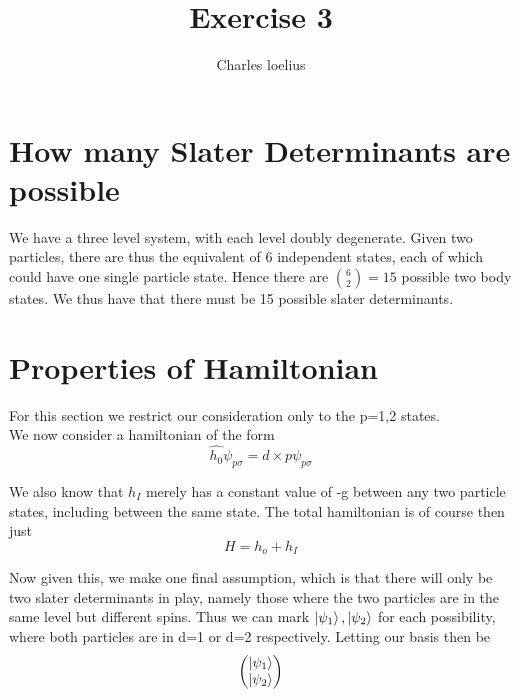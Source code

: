 \documentclass[11pt]{article} %
\title{Exercise 3}
\author{Charles loelius}
\begin{document}
\maketitle

\section{How many Slater Determinants are possible}

We have a three level system, with each level doubly degenerate. Given two particles, there are thus the equivalent of 6 independent states, each of which could have one single particle state. Hence there are ${ 6 \choose 2}=15$ possible two body states. We thus have that there must be 15 possible slater determinants. 

\section{Properties of Hamiltonian}
For this section we restrict our consideration only to the p=1,2 states.\\

We now consider a hamiltonian of the form\\
\begin{equation}
\hat{h_0}\psi_{p \sigma}=d\times p\psi_{p \sigma}
\end{equation}

We also know that $h_I$ merely has a constant value of -g between any two particle states, including between the same state. The total hamiltonian is of course then just \\
\begin{equation}
H=h_o+h_I
\end{equation}

Now given this, we make one final assumption, which is that there will only be two slater determinants in play, namely those where the two particles are in the same level but different spins. Thus we can mark $\ket{\psi_1}, \ket{\psi_2}$ for each possibility, where both particles are in d=1 or d=2 respectively. Letting our basis then be\\

\begin{equation}
\left( \begin{matrix} \ket{\psi_1} \\ \ket{\psi_2} \end{matrix} \right)
\end{equation}
\end{document}
